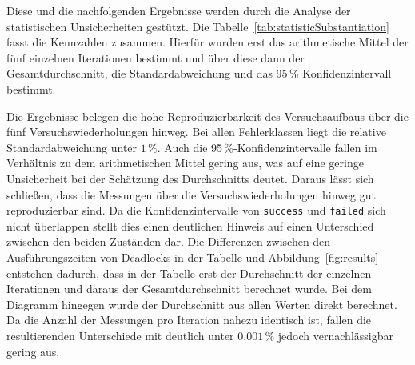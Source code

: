 

Diese und die nachfolgenden Ergebnisse werden durch die Analyse der statistischen Unsicherheiten gestützt.
Die Tabelle~\ref{tab:statisticSubstantiation} fasst die Kennzahlen zusammen.
Hierfür wurden erst das arithmetische Mittel der fünf einzelnen Iterationen bestimmt und über diese dann der
Gesamtdurchschnitt, die Standardabweichung und das 95\,\% Konfidenzintervall bestimmt.



Die Ergebnisse belegen die hohe Reproduzierbarkeit des Versuchsaufbaus über die fünf Versuchswiederholungen hinweg.
Bei allen Fehlerklassen liegt die relative Standardabweichung unter $1\,\%$.
Auch die 95\,\%-Konfidenzintervalle fallen im Verhältnis zu dem arithmetischen Mittel gering aus, was auf eine geringe
Unsicherheit bei der Schätzung des Durchschnitts deutet.
Daraus lässt sich schließen, dass die Messungen über die Versuchswiederholungen hinweg gut reproduzierbar sind.
Da die Konfidenzintervalle von \texttt{success} und \texttt{failed} sich nicht überlappen
stellt dies einen deutlichen Hinweis auf einen Unterschied zwischen den beiden Zuständen dar.
Die Differenzen zwischen den Ausführungszeiten von Deadlocks in der Tabelle und Abbildung~\ref{fig:results} entstehen
dadurch, dass in der Tabelle erst der Durchschnitt der einzelnen Iterationen und daraus der Gesamtdurchschnitt
berechnet wurde.
Bei dem Diagramm hingegen wurde der Durchschnitt aus allen Werten direkt berechnet.
Da die Anzahl der Messungen pro Iteration nahezu identisch ist, fallen die resultierenden Unterschiede mit deutlich
unter $0.001\,\%$ jedoch vernachlässigbar gering aus.
